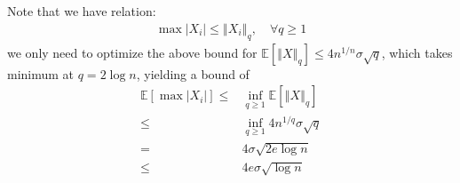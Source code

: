 \documentclass[11pt,a4paper]{ctexart}
\numberwithin{equation}{section}%
\begin{document}
\subsection{}
Note that we have relation:
\begin{align*}
    \max \left\vert X_i  \right\vert \leq \left\Vert X_i  \right\Vert _q,\quad \forall q \geq 1 
\end{align*}
we only need to optimize the above bound for $ \mathbb{E}\left[ \left\Vert X \right\Vert _q \right] \leq 4n^{1/n}\sigma \sqrt{q} $, which takes minimum at $ q=2\log n $, yielding a bound of 
\begin{align*}
    \mathbb{E}\left[ \max \left\vert X_i  \right\vert \right] \leq& \mathop{ \inf  }\limits_{q\geq 1} \mathbb{E}\left[ \left\Vert X \right\Vert _q \right] \\
    \leq & \mathop{ \inf  }\limits_{q\geq 1} 4n^{1/q} \sigma \sqrt{q} \\
    =& 4\sigma \sqrt{2e\log n}\\
    \leq & 4e\sigma \sqrt{\log n}
\end{align*}
\end{document}
